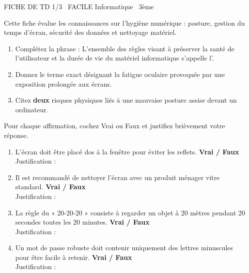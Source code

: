 \documentclass[11pt]{article}
\begin{document}
\begin{tcolorbox}[enhanced,colback=popink,colframe=popink,arc=10pt,boxrule=0pt,left=12pt,right=12pt,top=9pt,bottom=9pt]
{\color{white}\popxbold\small FICHE DE TD 1/3 \textbullet\ FACILE \hfill Informatique \textbullet\ 3ème\par}
\end{tcolorbox}
\vspace{4pt}
Cette fiche évalue les connaissances sur l'hygiène numérique : posture, gestion du temps d'écran, sécurité des données et nettoyage matériel.

\begin{exercice}
\begin{enumerate}
    \item Complétez la phrase : L'ensemble des règles visant à préserver la santé de l'utilisateur et la durée de vie du matériel informatique s'appelle l'\underline{\hspace{4cm}}.
    \item Donnez le terme exact désignant la fatigue oculaire provoquée par une exposition prolongée aux écrans.
    \item Citez \textbf{deux} risques physiques liés à une mauvaise posture assise devant un ordinateur.
\end{enumerate}
\end{exercice}

\begin{exercice}
Pour chaque affirmation, cochez Vrai ou Faux et justifiez brièvement votre réponse.
\begin{enumerate}
    \item L'écran doit être placé dos à la fenêtre pour éviter les reflets. \hfill \textbf{Vrai / Faux} \\
    Justification : \underline{\hspace{12cm}}
    \item Il est recommandé de nettoyer l'écran avec un produit ménager vitre standard. \hfill \textbf{Vrai / Faux} \\
    Justification : \underline{\hspace{12cm}}
    \item La règle du « 20-20-20 » consiste à regarder un objet à 20 mètres pendant 20 secondes toutes les 20 minutes. \hfill \textbf{Vrai / Faux} \\
    Justification : \underline{\hspace{12cm}}
    \item Un mot de passe robuste doit contenir uniquement des lettres minuscules pour être facile à retenir. \hfill \textbf{Vrai / Faux} \\
    Justification : \underline{\hspace{12cm}}
\end{enumerate}
\end{exercice}
\end{document}

